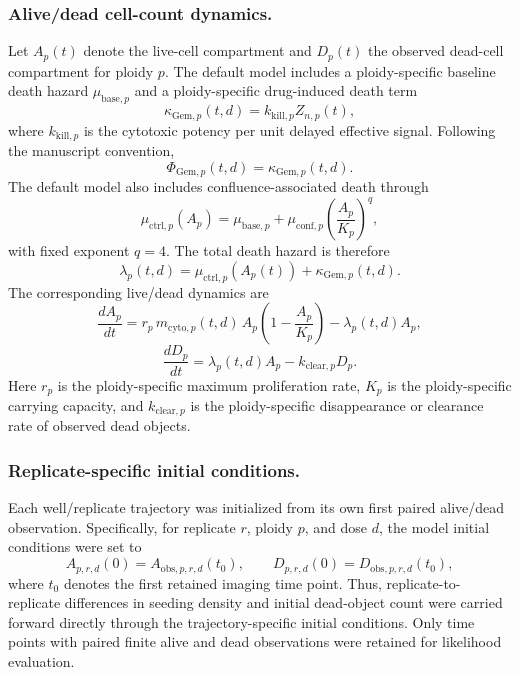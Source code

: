 \documentclass[11pt,notitlepage]{article}
\begin{document}
\subsubsection{Alive/dead cell-count dynamics.}
Let $A_p(t)$ denote the live-cell compartment and $D_p(t)$ the observed dead-cell compartment for ploidy $p$. The default model includes a ploidy-specific baseline death hazard $\mu_{\mathrm{base},p}$ and a ploidy-specific drug-induced death term
\[
\kappa_{\mathrm{Gem},p}(t,d)=k_{\mathrm{kill},p}Z_{n,p}(t),
\]
where $k_{\mathrm{kill},p}$ is the cytotoxic potency per unit delayed effective signal. Following the manuscript convention,
\[
\Phi_{\mathrm{Gem},p}(t,d)=\kappa_{\mathrm{Gem},p}(t,d).
\]
The default model also includes confluence-associated death through
\[
\mu_{\mathrm{ctrl},p}(A_p)
=
\mu_{\mathrm{base},p}
+
\mu_{\mathrm{conf},p}\left(\frac{A_p}{K_p}\right)^q,
\]
with fixed exponent $q=4$. The total death hazard is therefore
\[
\lambda_p(t,d)=\mu_{\mathrm{ctrl},p}(A_p(t))+\kappa_{\mathrm{Gem},p}(t,d).
\]
The corresponding live/dead dynamics are
\[
\frac{dA_p}{dt}
=
r_p\,m_{\mathrm{cyto},p}(t,d)\,
A_p\left(1-\frac{A_p}{K_p}\right)
-\lambda_p(t,d)A_p,
\]
\[
\frac{dD_p}{dt}
=
\lambda_p(t,d)A_p-k_{\mathrm{clear},p}D_p.
\]
Here $r_p$ is the ploidy-specific maximum proliferation rate, $K_p$ is the ploidy-specific carrying capacity, and $k_{\mathrm{clear},p}$ is the ploidy-specific disappearance or clearance rate of observed dead objects. 

\subsubsection{Replicate-specific initial conditions.}
Each well/replicate trajectory was initialized from its own first paired alive/dead observation. Specifically, for replicate \(r\), ploidy \(p\), and dose \(d\), the model initial conditions were set to
\[
A_{p,r,d}(0)=A_{\mathrm{obs},p,r,d}(t_0),
\qquad
D_{p,r,d}(0)=D_{\mathrm{obs},p,r,d}(t_0),
\]
where \(t_0\) denotes the first retained imaging time point. Thus, replicate-to-replicate differences in seeding density and initial dead-object count were carried forward directly through the trajectory-specific initial conditions. Only time points with paired finite alive and dead observations were retained for likelihood evaluation.
\end{document}

